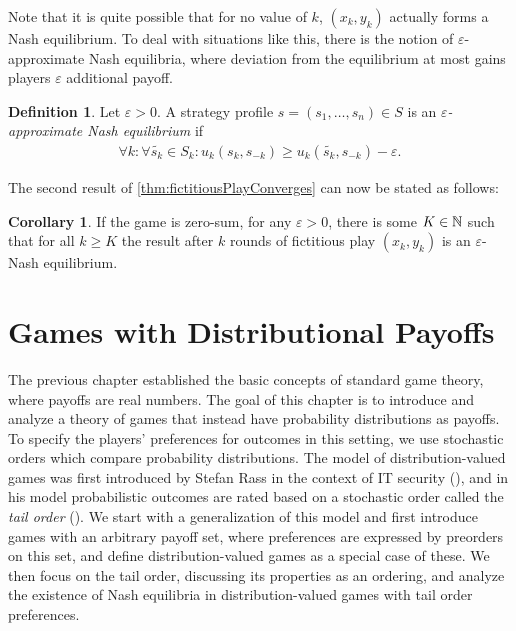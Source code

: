 \documentclass[a4paper,DIV=11,abstracton,twoside=semi]{scrreprt}
\let\epsilon\varepsilon
\theoremstyle{definition}
\newtheorem{cor}[thm]{Corollary}
\newtheorem{defn}[thm]{Definition} %
\begin{document}
    Note that it is quite possible that for no value of $k$, $(x_k, y_k)$ actually forms a Nash equilibrium.
    To deal with situations like this, there is the notion of $\epsilon$-approximate Nash equilibria, where deviation from the equilibrium at most gains players $\epsilon$ additional payoff.
        
    \begin{defn}
        Let $\epsilon > 0$.
        A strategy profile $s = (s_1, \dots, s_n) \in S$ is an \emph{$\epsilon$-approximate Nash equilibrium} if
        \begin{gather*} 
            \forall k: \forall \tilde{s_k} \in S_k: u_k(s_k, s_{-k}) \geq u_k(\tilde{s_k}, s_{-k}) - \epsilon.
        \end{gather*} 
    \end{defn}

    The second result of \ref{thm:fictitiousPlayConverges} can now be stated as follows:
    \begin{cor}
        If the game is zero-sum, for any $\epsilon > 0$, there is some $K \in \mathbb{N}$ such that for all $k \geq K$ the result after $k$ rounds of fictitious play $(x_k, y_k)$ is an $\epsilon$-Nash equilibrium.
    \end{cor}

    
    
    \chapter{Games with Distributional Payoffs}
    \label{chap:gamesWithDistributionalPayoffs}
    The previous chapter established the basic concepts of standard game theory, where payoffs are real numbers.
    The goal of this chapter is to introduce and analyze a theory of games that instead have probability distributions as payoffs.
    To specify the players' preferences for outcomes in this setting, we use stochastic orders which compare probability distributions.
    The model of distribution-valued games was first introduced by Stefan Rass
    in the context of IT security (\cite{bib:rassGameRiskManagI,bib:rassGameRiskManagII,bib:rassGameRiskManagIII}), and in his model probabilistic outcomes are rated based on a stochastic order called the \emph{tail order} (\cite{bib:rassTotalOrderingOnLossDistributions}).
    We start with a generalization of this model and first introduce games with an arbitrary payoff set, where preferences are expressed by preorders on this set, and define distribution-valued games as a special case of these.
    We then focus on the tail order, discussing its properties as an ordering, and analyze the existence of Nash equilibria in distribution-valued games with tail order preferences.
    
\end{document}
